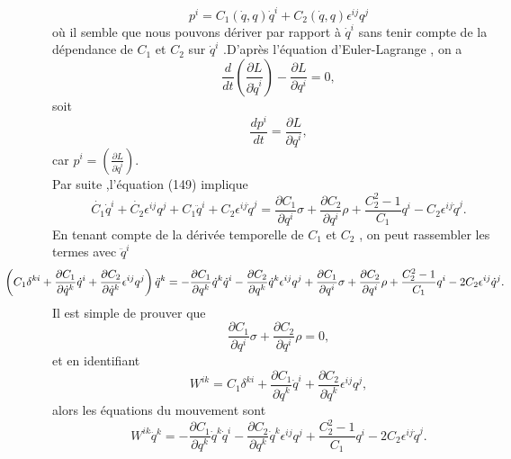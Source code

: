 \documentclass[12pt,a4paper, openany]{article}
\begin{document}
		 \begin{equation}
		 p^i=C_1(\dot{q}, q )\dot{q}^i+C_2(\dot{q}, q )\epsilon^{ij}q^j
		 \end{equation}
		 où il semble que nous pouvons dériver par rapport à $\dot{q}^i$ sans tenir compte de la dépendance de $C_1$ et $C_2$ sur $\dot{q}^i$ .D'après l'équation d'Euler-Lagrange , on a 
		 \begin{equation}
		 \frac{d}{dt}\left(\frac{\partial L}{\partial \dot{q}^i}\right)-\frac{\partial L}{\partial q^i}=0	,
		  \end{equation}
		  soit
		  \begin{equation}
		  	\frac{dp^i}{dt}=\frac{\partial L}{\partial q^i},	
		  \end{equation}
		  car $p^i=\left(\frac{\partial L}{\partial \dot{q}^i}\right)$.\\
		  Par suite ,l'équation (149) implique
		  \begin{equation}
		  \dot{C_1}\dot{q}^i+\dot{C_2}\epsilon^{ij}q^j+C_1\ddot{q}^i+C_2\epsilon^{ij
		  }\dot{q}^j=\frac{\partial C_1}{\partial q^i}\sigma+\frac{\partial C_2}{\partial q^i}\rho +\frac{C^{2}_2-1}{C_1}q^i -C_2\epsilon^{ij}\dot{q}^j  .
		  \end{equation}
		  En tenant compte de la dérivée temporelle de $C_1$ et $C_2$ , on peut rassembler les termes avec $\ddot{q}^i $
		  \begin{equation}
		  \hspace{-1.5cm}	\left(C_1\delta^{ki}+\frac{\partial C_1}{\partial\dot{q}^k}\dot{q}^i+\frac{\partial C_2}{\partial\dot{q}^k}\epsilon^{ij}q^j\right)\ddot{q}^k=-\frac{\partial C_1}{\partial {q}^k}\dot{q}^k\dot{q}^i-\frac{\partial C_2}{\partial{q}^k}\dot{q}^k\epsilon^{ij}q^j+\frac{\partial C_1}{\partial q^i}\sigma+\frac{\partial C_2}{\partial q^i}\rho+\frac{C^{2}_2-1}{C_1}q^i -2C_2\epsilon^{ij}\dot{q}^j .
		  \end{equation}
		  Il est simple de prouver que 
		  \begin{equation}
		  \frac{\partial C_1}{\partial q^i}\sigma+\frac{\partial C_2}{\partial q^i}\rho =0	,
		  \end{equation}
		  et en identifiant 
		  \begin{equation}
		  	W^{ik}=C_1\delta^{ki}+\frac{\partial C_1}{\partial\dot{q}^k}\dot{q}^i+\frac{\partial C_2}{\partial\dot{q}^k}\epsilon^{ij}q^j,
		  \end{equation}
		  alors les équations du mouvement sont 
		  \begin{equation}
		  	W^{ik}\ddot{q}^k=-\frac{\partial C_1}{\partial {q}^k}\dot{q}^k\dot{q}^i-\frac{\partial C_2}{\partial{q}^k}\dot{q}^k\epsilon^{ij}q^j+\frac{C^{2}_2-1}{C_1}q^i -2C_2\epsilon^{ij}\dot{q}^j .
		  \end{equation}
\end{document}
